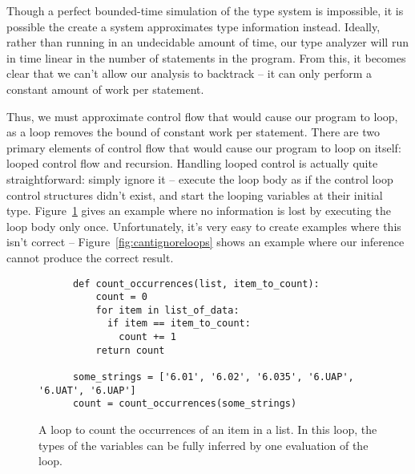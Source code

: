 \documentclass{article}[12pt]
\begin{document}
Though a perfect bounded-time simulation of the type system is impossible, it is possible the create
a system approximates type information instead. Ideally, rather than running in an undecidable
amount of time, our type analyzer will run in time linear in the number of statements in the
program. From this, it becomes clear that we can't allow our analysis to backtrack -- it can only
perform a constant amount of work per statement. 

Thus, we must approximate control flow that would cause our program to loop, as a loop removes the
bound of constant work per statement. There are two primary elements of control flow that would
cause our program to loop on itself: looped control flow and recursion. Handling looped control is
actually quite straightforward: simply ignore it -- execute the loop body as if the control loop
control structures didn't exist, and start the looping variables at their initial type.
Figure~\ref{fig:ignoreloops} gives an example where no information is lost by executing the loop
body only once. Unfortunately, it's very easy to create examples where this isn't correct --
Figure~\ref{fig:cantignoreloops} shows an example where our inference cannot produce the correct
result.

\begin{figure}
    \begin{verbatim}
      def count_occurrences(list, item_to_count):
          count = 0
          for item in list_of_data:
            if item == item_to_count: 
              count += 1
          return count
      
      some_strings = ['6.01', '6.02', '6.035', '6.UAP', '6.UAT', '6.UAP']
      count = count_occurrences(some_strings)

  \end{verbatim}
  \caption{A loop to count the occurrences of an item in a list. In this loop, the types of the
      variables can be fully inferred by one evaluation of the loop.
  }
  \label{fig:ignoreloops}
\end{figure}
\end{document}
